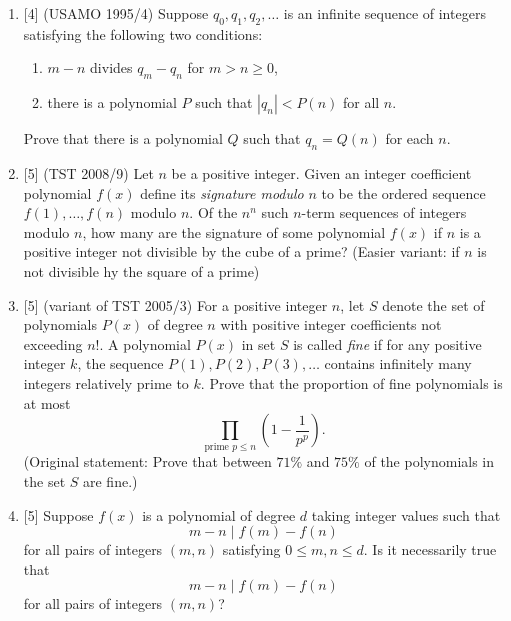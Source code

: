 \begin{enumerate}
\item{}[4] (USAMO 1995/4) Suppose $q_0,q_1,q_2,\ldots$ is an infinite sequence of integers satisfying the following two conditions:
\begin{enumerate}
\item $m-n$ divides $q_m-q_n$ for $m>n\geq 0$,
\item there is a polynomial $P$ such that $|q_n|<P(n)$ for all $n$.
\end{enumerate}
Prove that there is a polynomial $Q$ such that $q_n=Q(n)$ for each $n$.

\item{}[5] (TST 2008/9) Let $n$ be a positive integer. Given an integer coefficient polynomial $f(x)$ define its \emph{signature modulo} $n$ to be the ordered sequence $f(1),\ldots, f(n)$ modulo $n$. Of the $n^n$ such $n$-term sequences of integers modulo $n$, how many are the signature of some polynomial $f(x)$ if $n$ is a positive integer not divisible by the cube of a prime? (Easier variant: if $n$ is not divisible hy the square of a prime)

\item{}[5] (variant of TST 2005/3) For a positive integer $n$, let $S$ denote the set of polynomials $P(x)$ of degree $n$ with positive integer coefficients not exceeding $n!$. A polynomial $P(x)$ in set $S$ is called \emph{fine} if for any positive integer $k$, the sequence $P(1),P(2),P(3),\ldots$ contains infinitely many integers relatively prime to $k$. %
Prove that the proportion of fine polynomials is at most 
\[\prod_{\text{prime }p\leq n} \left(1-\frac{1}{p^p}\right).\]
(Original statement: Prove that between $71 \%$ and $75\%$ of the polynomials in the set $S$ are fine.)

\item{}[5] Suppose $f(x)$ is a polynomial of degree $d$ taking integer values such that
\[m-n\mid{f(m)-f(n)}\]
for all pairs of integers $(m,n)$ satisfying $0\leq m,n\leq d$. Is it necessarily true that
\[m-n\mid{f(m)-f(n)}\]
for all pairs of integers $(m,n)$?
\end{enumerate}


